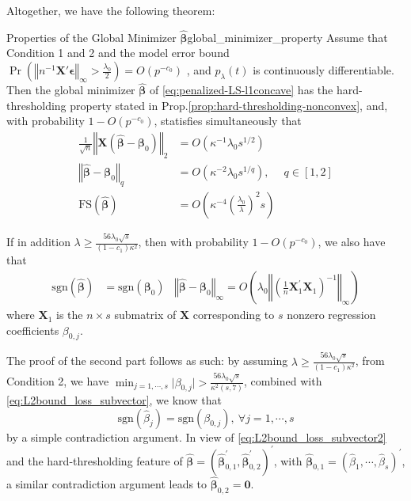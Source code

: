 \documentclass[twoside]{article}
\begin{document}
Altogether, we have the following theorem:
\begin{theorem}{Properties of the Global Minimizer $\hat{\boldsymbol{\beta}}$}{global_minimizer_property}
    Assume that Condition 1 and 2 and the model error bound $\Pr \left( \left\Vert n^{-1}\mathbf{X}'\boldsymbol{\epsilon}  \right\Vert _{\infty} >\frac{\lambda_0}{2} \right) = O\left(p^{-c_0}\right)$ , and $p_{\lambda}(t)$ is continuously differentiable. Then the global minimizer $\hat{\boldsymbol{\beta}}$ of \ref{eq:penalized-LS-l1concave} has the hard-thresholding property stated in Prop.\ref{prop:hard-thresholding-nonconvex}, and, with probability $1-O(p^{-c_0})$, statisfies simultaneously that
    \begin{align}
        \frac{1}{\sqrt{n}}\left\Vert \mathbf{X}\left( \hat{\boldsymbol{\beta}} -\boldsymbol{\beta}_0 \right) \right\Vert _2 &= O(\kappa^{-1}\lambda_0 s^{1/2}) \\
        \left\Vert \hat{\boldsymbol{\beta}}-\boldsymbol{\beta}_0 \right\Vert _q &= O(\kappa^{-2}\lambda_0 s^{1/q}), & q\in[1,2]\\
        \mathrm{FS}\left(\hat{\boldsymbol{\beta}}\right) &= O\left( \kappa^{-4} \left(\frac{\lambda_0}{\lambda}\right)^2 s \right)
    \end{align}

    If in addition $\lambda \geq \frac{56\lambda_0\sqrt{s}}{(1-c_1)\kappa^2}$, then with probability $1-O(p^{-c_0})$, we also have that 
    \begin{align*}
        \mathrm{sgn}\left(\hat{\boldsymbol{\beta}}\right) &= \mathrm{sgn}\left(\boldsymbol{\beta}_0\right) & \left\Vert \hat{\boldsymbol{\beta}}-\boldsymbol{\beta}_0 \right\Vert _{\infty} = O\left(\lambda_0\left\Vert \left(\frac{1}{n}\mathbf{X}^{\prime}_1\mathbf{X}_1 \right)^{-1} \right\Vert _{\infty}\right)
    \end{align*}
    where $\mathbf{X}_1$ is the $n\times s$ submatrix of $\mathbf{X}$ corresponding to $s$ nonzero regression coefficients $\beta_{0,j}$.
\end{theorem}
The proof of the second part follows as such: by assuming $\lambda \geq \frac{56\lambda_0\sqrt{s}}{(1-c_1)\kappa^2}$, from Condition 2, we have $\min_{j=1,\cdots,s}\lvert \beta_{0,j}\rvert > \frac{56\lambda_0\sqrt{s}}{\kappa^2(s,7)}$, combined with \ref{eq:L2bound_loss_subvector}, we know that
$$
\mathrm{sgn}\left( \hat{\beta}_j \right) = \mathrm{sgn}\left(\beta_{0,j}\right),\ \forall j=1,\cdots, s
$$
by a simple contradiction argument. In view of \ref{eq:L2bound_loss_subvector2} and the hard-thresholding feature of $\hat{\boldsymbol{\beta}} = \left( \hat{\boldsymbol{\beta}}_{0,1}^{\prime},\hat{\boldsymbol{\beta}}_{0,2}^{\prime} \right)^{\prime}$, with $\hat{\boldsymbol{\beta}}_{0,1} = \left(\hat{\beta}_1,\cdots,\hat{\beta}_s\right)^{\prime}$, a similar contradiction argument leads to $\hat{\boldsymbol{\beta}}_{0,2}=\mathbf{0}$.

\newpage


\end{document}

